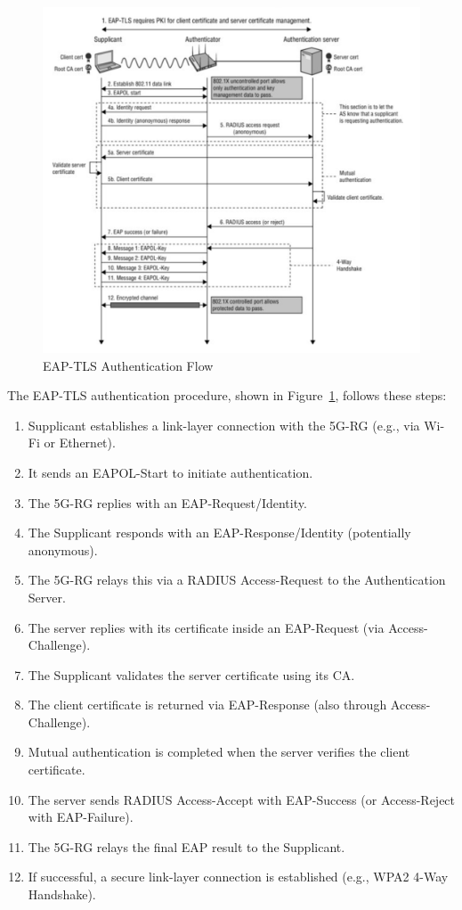 \begin{figure}
    \centering
    \includegraphics[width=0.75\linewidth]{figs/eap-tls-auth-flow.png}
    \caption{\acs{EAP-TLS} Authentication Flow}
    \label{fig:eap-tls-auth-flow}
\end{figure}

The \ac{EAP-TLS} authentication procedure, shown in Figure~\ref{fig:eap-tls-auth-flow}, follows these steps:

\begin{enumerate}
    \item Supplicant establishes a link-layer connection with the \ac{5G-RG} (e.g., via Wi-Fi or Ethernet).
    \item It sends an \ac{EAPOL}-Start to initiate authentication.
    \item The \ac{5G-RG} replies with an \ac{EAP}-Request/Identity.
    \item The Supplicant responds with an \ac{EAP}-Response/Identity (potentially anonymous).
    \item The \ac{5G-RG} relays this via a \ac{RADIUS} Access-Request to the Authentication Server.
    \item The server replies with its certificate inside an \ac{EAP}-Request (via Access-Challenge).
    \item The Supplicant validates the server certificate using its \ac{CA}.
    \item The client certificate is returned via \ac{EAP}-Response (also through Access-Challenge).
    \item Mutual authentication is completed when the server verifies the client certificate.
    \item The server sends \ac{RADIUS} Access-Accept with \ac{EAP}-Success (or Access-Reject with \ac{EAP}-Failure).
    \item The \ac{5G-RG} relays the final \ac{EAP} result to the Supplicant.
    \item If successful, a secure link-layer connection is established (e.g., \ac{WPA}2 4-Way Handshake).
\end{enumerate}

